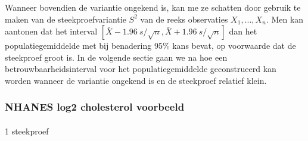\documentclass[
  dutch,
  letterpaper,
  12pt]{book}
\makeatletter
\let\oldparagraph\paragraph
\renewcommand{\paragraph}{
    \@ifstar
      \xxxParagraphStar
      \xxxParagraphNoStar
  }
\newcommand{\xxxParagraphStar}[1]{\oldparagraph*{#1}\mbox{}}
\newcommand{\xxxParagraphNoStar}[1]{\oldparagraph{#1}\mbox{}}
\newenvironment{Shaded}{\begin{snugshade}}{\end{snugshade}}
\newcommand{\AttributeTok}[1]{\textcolor[rgb]{0.40,0.45,0.13}{#1}}
\newcommand{\DecValTok}[1]{\textcolor[rgb]{0.68,0.00,0.00}{#1}}
\newcommand{\FloatTok}[1]{\textcolor[rgb]{0.68,0.00,0.00}{#1}}
\newcommand{\FunctionTok}[1]{\textcolor[rgb]{0.28,0.35,0.67}{#1}}
\newcommand{\NormalTok}[1]{\textcolor[rgb]{0.00,0.23,0.31}{#1}}
\newcommand{\OtherTok}[1]{\textcolor[rgb]{0.00,0.23,0.31}{#1}}
\newcommand{\SpecialCharTok}[1]{\textcolor[rgb]{0.37,0.37,0.37}{#1}}
\theoremstyle{definition}
\theoremstyle{definition}
\theoremstyle{definition}
\theoremstyle{remark}
\makeatother
\begin{document}
Wanneer bovendien de variantie ongekend is, kan me ze schatten door
gebruik te maken van de steekproefvariantie \(S^2\) van de reeks
observaties \(X_1,...,X_n\). Men kan aantonen dat het interval
\([\bar{X} - 1.96 \ s/\sqrt{n} , \bar{X} + 1.96 \ s/\sqrt{n} ]\) dan het
populatiegemiddelde met bij benadering 95\% kans bevat, op voorwaarde
dat de steekproef groot is. In de volgende sectie gaan we na hoe een
betrouwbaarheidsinterval voor het populatiegemiddelde geconstrueerd kan
worden wanneer de variantie ongekend is en de steekproef relatief klein.

\subsubsection{NHANES log2 cholesterol
voorbeeld}\label{nhanes-log2-cholesterol-voorbeeld}

\paragraph{1 steekproef}\label{steekproef-1}

\begin{Shaded}
\end{Shaded}
\end{document}
